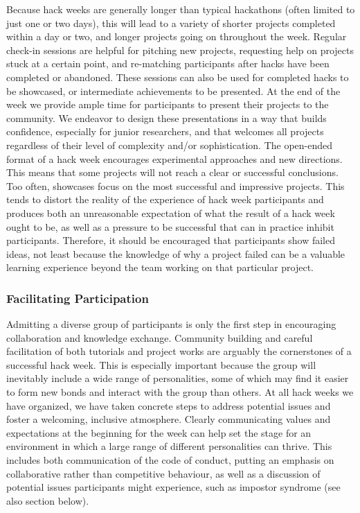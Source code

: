 \documentclass{aastex62}
\begin{document}
Because hack weeks are generally longer than typical hackathons (often limited to just one or two days), this will lead to a variety of shorter projects completed within a day or two, and longer projects going on throughout the week. Regular check-in sessions are helpful for pitching new projects, requesting help on projects stuck at a certain point, and re-matching participants after hacks have been completed or abandoned. These sessions can also be used for completed hacks to be showcased, or intermediate achievements to be presented. At the end of the week we provide ample time for participants to present their projects to the community. We endeavor to design these presentations in a way that builds confidence, especially for junior researchers, and that welcomes all projects regardless of their level of complexity and/or sophistication. The open-ended format of a hack week encourages experimental approaches and new directions. This means that some projects will not reach a clear or successful conclusions. Too often, showcases focus on the most successful and impressive projects. This tends to distort the reality of the experience of hack week participants and produces both an unreasonable expectation of what the result of a hack week ought to be, as well as a pressure to be successful that can in practice inhibit participants. Therefore, it should be encouraged that participants show failed ideas, not least because the knowledge of why a project failed can be a valuable learning experience beyond the team working on that particular project.

\subsubsection{Facilitating Participation}

Admitting a diverse group of participants is only the first step in encouraging collaboration and knowledge exchange. Community building and careful facilitation of both tutorials and project works are arguably the cornerstones of a successful hack week. This is especially important because the group will inevitably include a wide range of personalities, some of which may find it easier to form new bonds and interact with the group than others. At all hack weeks we have organized, we have taken concrete steps to address potential issues and foster a welcoming, inclusive atmosphere. Clearly communicating values and expectations at the beginning for the week can help set the stage for an environment in which a large range of different personalities can thrive. This includes both communication of the code of conduct, putting an emphasis on collaborative rather than competitive behaviour, as well as a discussion of potential issues participants might experience, such as impostor syndrome (see also section below).
\end{document}
